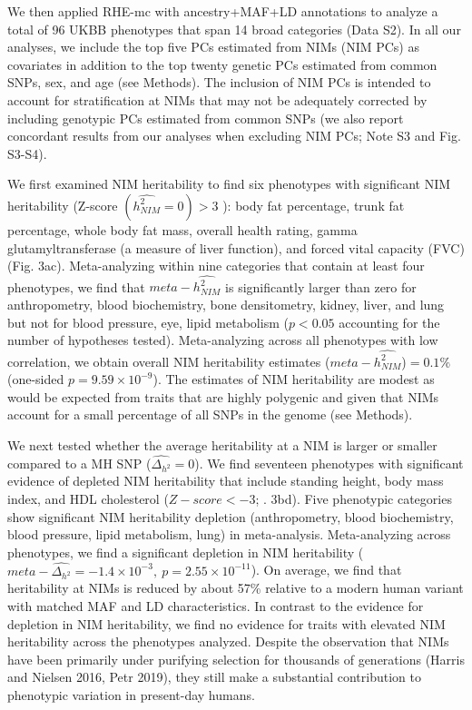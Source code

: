 We then applied RHE-mc with ancestry+MAF+LD annotations to analyze a total of 96 UKBB phenotypes that span 14 broad categories (Data S2). In all our analyses, we include the top five PCs estimated from NIMs (NIM PCs) as covariates in addition to the top twenty genetic PCs estimated from common SNPs, sex, and age (see Methods). The inclusion of NIM PCs is intended to account for stratification at NIMs that may not be adequately corrected by including genotypic PCs estimated from common SNPs (we also report concordant results from our analyses when excluding NIM PCs; Note S3 and Fig. S3-S4).

We first examined NIM heritability to find six phenotypes with significant NIM heritability (Z-score $(\hat{h^2_{NIM}}=0)>3$ ): body fat percentage, trunk fat percentage, whole body fat mass, overall health rating, gamma glutamyltransferase (a measure of liver function), and forced vital capacity (FVC) (Fig. 3ac). Meta-analyzing within nine categories that contain at least four phenotypes, we find that $meta-\hat{h^2_{NIM}}$ is significantly larger than zero for anthropometry, blood biochemistry, bone densitometry, kidney, liver, and lung but not for blood pressure, eye, lipid metabolism ($p < 0.05$ accounting for the number of hypotheses tested).  Meta-analyzing across all phenotypes with low correlation, we obtain overall NIM heritability estimates ($meta -\hat{h^2_{NIM}}$)$=0.1\%$ (one-sided $p=9.59\times10^{-9}$). The estimates of NIM heritability are modest as would be expected from traits that are highly polygenic and given that NIMs account for a small percentage of all SNPs in the genome (see Methods). 

We next tested whether the average heritability at a NIM is larger or smaller compared to a MH SNP ($\hat{\Delta_{h^2}}=0$). We find seventeen phenotypes with significant evidence of depleted NIM heritability that include standing height, body mass index, and HDL cholesterol ($Z-score < -3$; \Fig. 3bd). Five phenotypic categories show significant NIM heritability depletion (anthropometry, blood biochemistry, blood pressure, lipid metabolism, lung) in meta-analysis. Meta-analyzing across phenotypes, we find a significant depletion in NIM heritability ($meta-\hat{\Delta_{h^2}} = -1.4\times10^{-3},\ p= 2.55\times10^{-11}$). On average, we find that heritability at NIMs is reduced by about 57\% relative to a modern human variant with matched MAF and LD characteristics. In contrast to the evidence for depletion in NIM heritability, we find no evidence for traits with elevated NIM heritability across the phenotypes analyzed. Despite the observation that NIMs have been primarily under purifying selection for thousands of generations (Harris and Nielsen 2016, Petr 2019), they still make a substantial contribution to phenotypic variation in present-day humans. 
  
